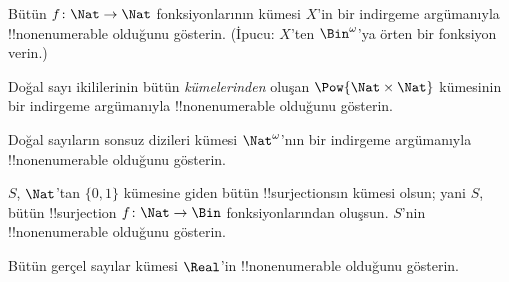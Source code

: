 \documentclass[../../../include/open-logic-section]{subfiles}
\begin{document}
\begin{prob}\label{sfr:siz:red-alt:prob:nat-nat}
  Bütün $f\colon\Nat\to\Nat$ fonksiyonlarının kümesi $X$'in bir indirgeme
  argümanıyla !!{nonenumerable} olduğunu gösterin. (İpucu: $X$'ten
  $\Bin^\omega$'ya örten bir fonksiyon verin.)
\end{prob}

\begin{prob}
Doğal sayı ikililerinin bütün \emph{kümelerinden} oluşan
$\Pow{\Nat\times\Nat}$ kümesinin bir indirgeme argümanıyla !!{nonenumerable}
olduğunu gösterin.
\end{prob}

\begin{prob}
Doğal sayıların sonsuz dizileri kümesi $\Nat^\omega$'nın bir indirgeme
argümanıyla !!{nonenumerable} olduğunu gösterin.
\end{prob}


\begin{prob}
$S$, $\Nat$'tan $\{0,1\}$ kümesine giden bütün !!{surjection}s{}ın kümesi
olsun; yani $S$, bütün !!{surjection} $f\colon\Nat\to\Bin$ fonksiyonlarından
oluşsun. $S$'nin !!{nonenumerable} olduğunu gösterin.
\end{prob}

\begin{prob}
Bütün gerçel sayılar kümesi $\Real$'in !!{nonenumerable} olduğunu gösterin.
\end{prob}
\end{document}
